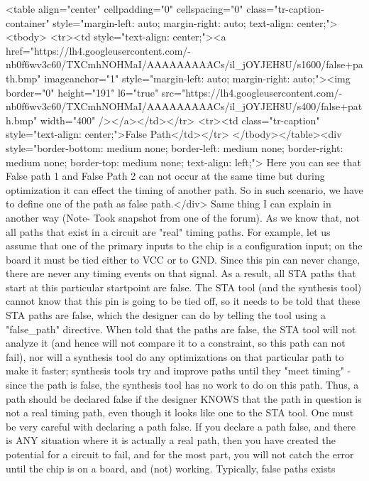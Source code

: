 <table align="center" cellpadding="0" cellspacing="0" class="tr-caption-container" style="margin-left: auto; margin-right: auto; text-align: center;"><tbody>
<tr><td style="text-align: center;"><a href="https://lh4.googleusercontent.com/-nb0f6wv3c60/TXCmhNOHMaI/AAAAAAAAACs/il_jOYJEH8U/s1600/false+path.bmp" imageanchor="1" style="margin-left: auto; margin-right: auto;"><img border="0" height="191" l6="true" src="https://lh4.googleusercontent.com/-nb0f6wv3c60/TXCmhNOHMaI/AAAAAAAAACs/il_jOYJEH8U/s400/false+path.bmp" width="400" /></a></td></tr>
<tr><td class="tr-caption" style="text-align: center;">False Path</td></tr>
</tbody></table><div style="border-bottom: medium none; border-left: medium none; border-right: medium none; border-top: medium none; text-align: left;">
Here you can see that False path 1 and False Path 2 can not occur at the same time but during optimization it can effect the timing of another path. So in such scenario, we have to define one of the path as false path.</div>
Same thing I can explain in another way (Note- Took snapshot from one of the forum). As we know that, not all paths that exist in a circuit are "real" timing paths. For example, let us assume that one of the primary inputs to the chip is a configuration input; on the board it must be tied either to VCC or to GND. Since this pin can never change, there are never any timing events on that signal. As a result, all STA paths that start at this particular startpoint are false. The STA tool (and the synthesis tool) cannot know that this pin is going to be tied off, so it needs to be told that these STA paths are false, which the designer can do by telling the tool using a "false_path" directive. When told that the paths are false, the STA tool will not analyze it (and hence will not compare it to a constraint, so this path can not fail), nor will a synthesis tool do any optimizations on that particular path to make it faster; synthesis tools try and improve paths until they "meet timing" - since the path is false, the synthesis tool has no work to do on this path.
Thus, a path should be declared false if the designer KNOWS that the path in question is not a real timing path, even though it looks like one to the STA tool. One must be very careful with declaring a path false. If you declare a path false, and there is ANY situation where it is actually a real path, then you have created the potential for a circuit to fail, and for the most part, you will not catch the error until the chip is on a board, and (not) working. Typically, false paths exists


